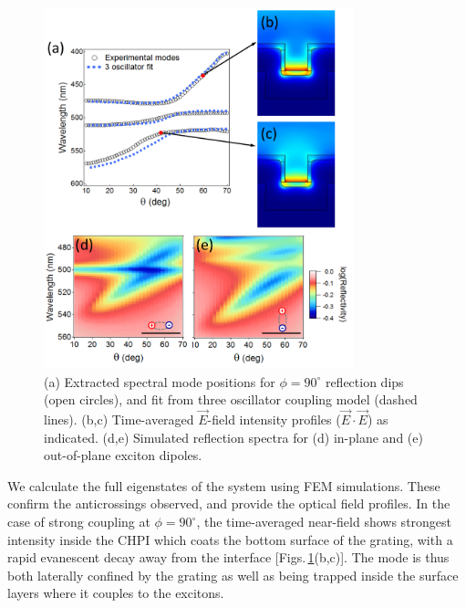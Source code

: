 \begin{figure}[h!] 
\centering    
\includegraphics[width=0.8\textwidth]{Fig18}
\caption{(a) Extracted spectral mode positions for $\phi=90^{\circ}$ reflection dips (open circles), and fit from three oscillator coupling model (dashed lines). (b,c) Time-averaged $\vec{E}$-field intensity profiles ($\vec{E}\cdot\vec{E}$) as indicated. (d,e) Simulated reflection spectra for (d) in-plane and (e) out-of-plane exciton dipoles.}
\label{7Fig18}
\end{figure}
We calculate the full eigenstates of the system using FEM simulations. These confirm the anticrossings observed, and provide the optical field profiles.
In the case of strong coupling at $\phi=90^{\circ}$, the time-averaged near-field shows strongest intensity inside the CHPI which coats the bottom surface of the grating, with a rapid evanescent decay away from the interface [Figs.\,\ref{7Fig18}(b,c)]. The mode is thus both laterally confined by the grating as well as being trapped inside the surface layers where it couples to the excitons.

